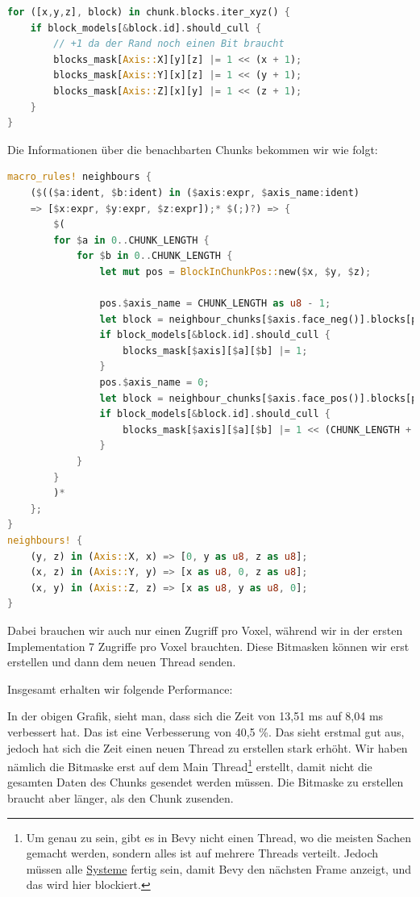 \begin{lstlisting}[language=Rust]
for ([x,y,z], block) in chunk.blocks.iter_xyz() {
	if block_models[&block.id].should_cull {
		// +1 da der Rand noch einen Bit braucht
		blocks_mask[Axis::X][y][z] |= 1 << (x + 1);
		blocks_mask[Axis::Y][x][z] |= 1 << (y + 1);
		blocks_mask[Axis::Z][x][y] |= 1 << (z + 1);
	}
}
\end{lstlisting}

Die Informationen über die benachbarten Chunks
bekommen wir wie folgt:

\begin{lstlisting}[language=Rust]
macro_rules! neighbours {
	($(($a:ident, $b:ident) in ($axis:expr, $axis_name:ident)
	=> [$x:expr, $y:expr, $z:expr]);* $(;)?) => {
		$(
		for $a in 0..CHUNK_LENGTH {
			for $b in 0..CHUNK_LENGTH {
				let mut pos = BlockInChunkPos::new($x, $y, $z);

				pos.$axis_name = CHUNK_LENGTH as u8 - 1;
				let block = neighbour_chunks[$axis.face_neg()].blocks[pos];
				if block_models[&block.id].should_cull {
					blocks_mask[$axis][$a][$b] |= 1;
				}
				pos.$axis_name = 0;
				let block = neighbour_chunks[$axis.face_pos()].blocks[pos];
				if block_models[&block.id].should_cull {
					blocks_mask[$axis][$a][$b] |= 1 << (CHUNK_LENGTH + 1);
				}
			}
		}
		)*
	};
}
neighbours! {
	(y, z) in (Axis::X, x) => [0, y as u8, z as u8];
	(x, z) in (Axis::Y, y) => [x as u8, 0, z as u8];
	(x, y) in (Axis::Z, z) => [x as u8, y as u8, 0];
}
\end{lstlisting}

Dabei brauchen wir auch nur einen Zugriff pro Voxel,
während wir in der ersten Implementation 7 Zugriffe
pro Voxel brauchten.
Diese Bitmasken können wir erst erstellen und
dann dem neuen Thread senden.

Insgesamt erhalten wir folgende Performance:

\vspace{0.3cm}


\vspace{0.3cm}

In der obigen Grafik, sieht man, dass sich die Zeit
von 13,51 ms auf 8,04 ms verbessert hat.
Das ist eine Verbesserung von 40,5 \%.
Das sieht erstmal gut aus,
jedoch hat sich die Zeit einen neuen Thread zu
erstellen stark erhöht. Wir haben nämlich die Bitmaske
erst auf dem Main Thread\footnote{
	Um genau zu sein, gibt es in Bevy
	nicht einen  Thread, wo die meisten Sachen
	gemacht werden, sondern alles ist auf mehrere Threads
	verteilt. Jedoch müssen alle
	\href{https://bevy-cheatbook.github.io/programming/systems.html}{Systeme}
	\cite{bevy_systems} fertig sein, damit Bevy den
	nächsten Frame anzeigt, und das wird hier blockiert.
}
erstellt, damit nicht die
gesamten Daten des Chunks gesendet werden müssen.
Die Bitmaske zu erstellen braucht aber länger,
als den Chunk zusenden.


